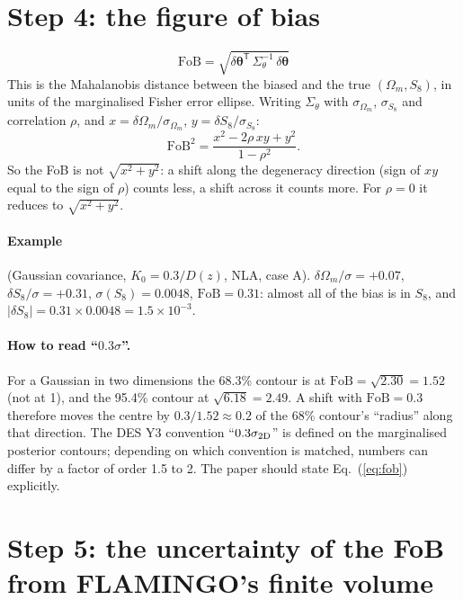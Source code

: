 \documentclass[11pt]{article}
\newcommand{\vth}{\bm{\theta}}
\newcommand{\tp}{^{\mathsf T}}
\newcommand{\fob}{\mathrm{FoB}}
\begin{document}
\section{Step 4: the figure of bias}

\begin{equation}
\boxed{\ \fob = \sqrt{\delta\vth\tp\,\Sigma_\theta^{-1}\,\delta\vth}\ }
\label{eq:fob}
\end{equation}
This is the Mahalanobis distance between the biased and the true
$(\Omega_m, S_8)$, in units of the marginalised Fisher error ellipse.
Writing $\Sigma_\theta$ with $\sigma_{\Omega_m}$, $\sigma_{S_8}$ and
correlation $\rho$, and $x = \delta\Omega_m/\sigma_{\Omega_m}$,
$y = \delta S_8/\sigma_{S_8}$:
\begin{equation}
\fob^2 = \frac{x^2 - 2\rho\,xy + y^2}{1-\rho^2}.
\end{equation}
So the FoB is not $\sqrt{x^2+y^2}$: a shift along the degeneracy direction
(sign of $xy$ equal to the sign of $\rho$) counts less, a shift across it
counts more. For $\rho = 0$ it reduces to $\sqrt{x^2+y^2}$.

\paragraph{Example} (Gaussian covariance, $K_0 = 0.3/D(z)$, NLA, case A).
$\delta\Omega_m/\sigma = +0.07$, $\delta S_8/\sigma = +0.31$,
$\sigma(S_8) = 0.0048$, $\fob = 0.31$: almost all of the bias is in $S_8$,
and $|\delta S_8| = 0.31\times0.0048 = 1.5\times10^{-3}$.

\paragraph{How to read ``$0.3\sigma$''.} For a Gaussian in two dimensions the
68.3\% contour is at $\fob = \sqrt{2.30} = 1.52$ (not at 1), and the 95.4\%
contour at $\sqrt{6.18} = 2.49$. A shift with $\fob = 0.3$ therefore moves
the centre by $0.3/1.52 \approx 0.2$ of the 68\% contour's ``radius'' along
that direction. The DES Y3 convention ``$0.3\sigma_{\rm 2D}$'' is defined on
the marginalised posterior contours; depending on which convention is
matched, numbers can differ by a factor of order 1.5 to 2. The paper should
state Eq.~(\ref{eq:fob}) explicitly.

\section{Step 5: the uncertainty of the FoB from FLAMINGO's finite volume}
\end{document}
